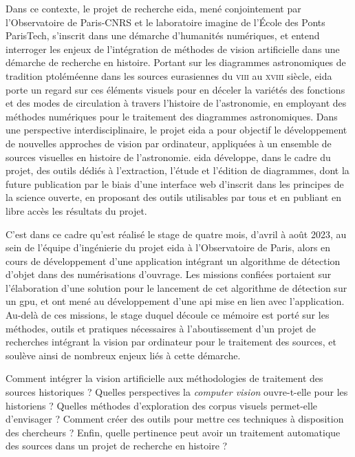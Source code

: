 \documentclass[a4paper,12pt,twoside]{book}
\newcommand{\api}{\gls{api}\xspace}
\newcommand{\eida}{\gls{eida}\xspace}
\newcommand{\imagine}{\gls{imagine}\xspace}
\newcommand{\ponts}{École des Ponts ParisTech\xspace}
\newcommand{\viii}{\textsc{viii}\ieme{}\xspace}
\newcommand{\xviii}{\textsc{xviii}\ieme{}\xspace}
\begin{document}
	Dans ce contexte, le projet de recherche \eida, mené conjointement par l'Observatoire de Paris-CNRS et le laboratoire \imagine de l'\ponts, s'inscrit dans une démarche d'humanités numériques, et entend interroger les enjeux de l'intégration de méthodes de vision artificielle dans une démarche de recherche en histoire. Portant sur les diagrammes astronomiques de tradition ptoléméenne dans les sources eurasiennes du \viii au \xviii siècle, \eida porte un regard sur ces éléments visuels pour en déceler la variétés des fonctions et des modes de circulation à travers l'histoire de l'astronomie, en employant des méthodes numériques pour le traitement des diagrammes astronomiques. Dans une perspective interdisciplinaire, le projet \eida a pour objectif le développement de nouvelles approches de vision par ordinateur, appliquées à un ensemble de sources visuelles en histoire de l'astronomie. \eida développe, dans le cadre du projet, des outils dédiés à l'extraction, l'étude et l'édition de diagrammes, dont la future publication par le biais d'une interface web d'inscrit dans les principes de la science ouverte, en proposant des outils utilisables par tous et en publiant en libre accès les résultats du projet.
	
	C'est dans ce cadre qu'est réalisé le stage de quatre mois, d'avril à août 2023, au sein de l'équipe d'ingénierie du projet \eida à l'Observatoire de Paris, alors en cours de développement d'une application intégrant un algorithme de détection d'objet dans des numérisations d'ouvrage. Les missions confiées portaient sur l'élaboration d'une solution pour le lancement de cet algorithme de détection sur un \acrshort{gpu}, et ont mené au développement d'une \api mise en lien avec l'application. Au-delà de ces missions, le stage duquel découle ce mémoire est porté sur les méthodes, outils et pratiques nécessaires à l'aboutissement d'un projet de recherches intégrant la vision par ordinateur pour le traitement des sources, et soulève ainsi de nombreux enjeux liés à cette démarche.
	
	Comment intégrer la vision artificielle aux méthodologies de traitement des sources historiques ? Quelles perspectives la \textit{computer vision} ouvre-t-elle pour les historiens ? Quelles méthodes d'exploration des corpus visuels permet-elle d'envisager ? Comment créer des outils pour mettre ces techniques à disposition des chercheurs ? Enfin, quelle pertinence peut avoir un traitement automatique des sources dans un projet de recherche en histoire ?
	
\end{document}
